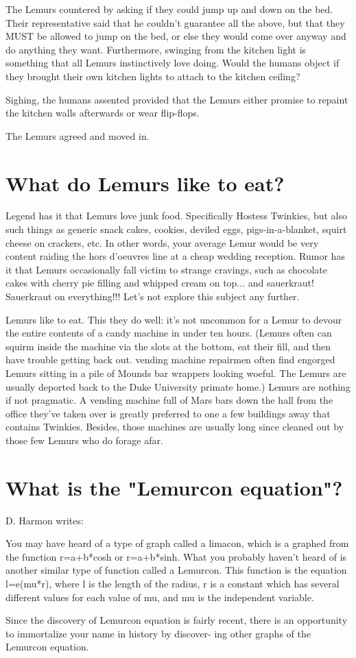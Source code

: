         The Lemurs countered by asking if they could jump up and
         down on the bed.  Their representative said that he 
         couldn't guarantee all the above, but that they MUST be
         allowed to jump on the bed, or else they would come over
         anyway and do anything they want.  Furthermore, swinging
         from the kitchen light is something that all Lemurs
         instinctively love doing.   Would the humans object if they
         brought their own kitchen lights to attach to the kitchen
         ceiling?

        Sighing, the humans assented provided that the Lemurs
         either promise to repaint the kitchen walls afterwards or
         wear flip-flops.

        The Lemurs agreed and moved in.

\chapter{What do Lemurs like to eat?}

Legend has it that Lemurs love junk food.  Specifically Hostess
Twinkies, but also such things as generic snack cakes, cookies,
deviled eggs, pigs-in-a-blanket, squirt cheese on crackers, etc.
In other words, your average Lemur would be very content raiding
the hors d'oeuvres line at a cheap wedding reception.  Rumor has
it that Lemurs occasionally fall victim to strange cravings, such
as chocolate cakes with cherry pie filling and whipped cream on
top... and sauerkraut!  Sauerkraut on everything!!!  Let's not
explore this subject any further.

Lemurs like to eat.  This they do well: it's not uncommon for a
Lemur to devour the entire contents of a candy machine in under
ten hours.  (Lemurs often can squirm inside the machine via the
slots at the bottom, eat their fill, and then have trouble getting
back out.  vending machine repairmen often find engorged Lemurs
sitting in a pile of Mounds bar wrappers looking woeful.  The
Lemurs are usually deported back to the Duke University primate
home.)  Lemurs are nothing if not pragmatic.  A vending machine
full of Mars bars down the hall from the office they've taken over
is greatly preferred to one a few buildings away that contains
Twinkies.  Besides, those machines are usually long since cleaned
out by those few Lemurs who do forage afar.

\chapter{What is the "Lemurcon equation"?}

D. Harmon writes:

You may have heard of a type of graph called a limacon, which is a
graphed from the function r=a+b*cosh or r=a+b*sinh.  What you
probably haven't heard of is another similar type of function
called a Lemurcon.  This function is the equation l=e(mu*r),
where l is the length of the radius, r is a constant which has
several different values for each value of mu, and mu is the
independent variable.

Since the discovery of Lemurcon equation is fairly recent, there
is an opportunity to immortalize your name in history by discover-
ing other graphs of the Lemurcon equation.  
